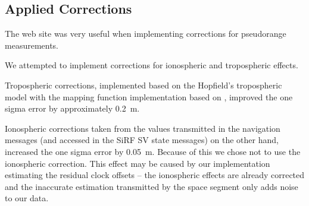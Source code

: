 \subsection{Applied Corrections}
\label{sec:impl-corrections}
The web site \cite{sam-www} was very useful when implementing corrections for
pseudorange measurements.

We attempted to implement corrections for ionospheric and tropospheric
effects.

Tropospheric corrections,
implemented based on the Hopfield's tropospheric model
with the mapping function implementation based on \cite{sam-www},
improved the one sigma error by approximately \SI{0.2}{\meter}.

Ionospheric corrections taken from the values transmitted in the navigation messages
(and accessed in the SiRF SV state messages) on the other hand,
increased the one sigma error by \SI{0.05}{\meter}.
Because of this we chose not to use the ionospheric correction.
This effect may be caused by our implementation estimating the residual
clock offsets -- the ionospheric effects are already corrected
and the inaccurate estimation transmitted by the space segment only adds noise
to our data.



